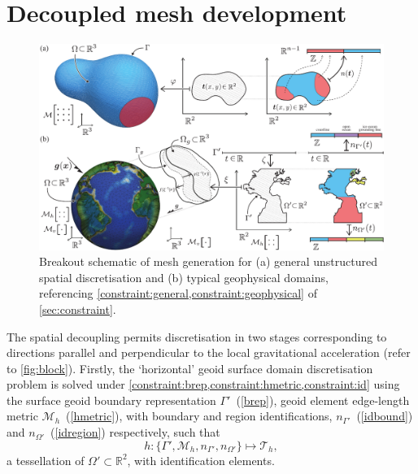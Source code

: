 \documentclass[a4paper, 10pt]{book}
\providecommand{\eqref}[1]{(\ref{#1})}
\begin{document}
\section{Decoupled mesh development}
\label{sec:decoupled}
%
\begin{figure}[!h]
\begin{center}
\includegraphics[width=\textwidth]{fig/breakout.pdf}
\end{center}
\vspace{-2.8ex}
\caption{Breakout schematic of mesh generation for
(a) general unstructured spatial discretisation
and
(b) typical geophysical domains,
referencing \cref{constraint:general,constraint:geophysical} of \cref{sec:constraint}.
}
\label{fig:breakout}
\vspace{-2ex}
\end{figure}
%
The spatial decoupling permits discretisation in two stages
corresponding to directions parallel and perpendicular to the local gravitational acceleration (refer to \cref{fig:block}).
%
Firstly, the `horizontal' geoid surface domain discretisation problem is solved
%
under \cref{constraint:brep,constraint:hmetric,constraint:id}
using
the surface geoid boundary representation $\Gamma'$~\eqref{brep},
geoid element edge-length metric $\mathcal{M}_h$~\eqref{hmetric},
with
boundary and region identifications, 
$n_{\Gamma'}$~\eqref{idbound}
and
$n_{\Omega'}$~\eqref{idregion}
respectively,
such that
\begin{equation}
h\!: \{\Gamma', \mathcal{M}_h, n_{\Gamma'}, n_{\Omega'}\} \mapsto \mathcal{T}_h,
\label{h}
\end{equation}
a tessellation of $\Omega' \subset \mathbb{R}^2$, with identification elements.
\end{document}
